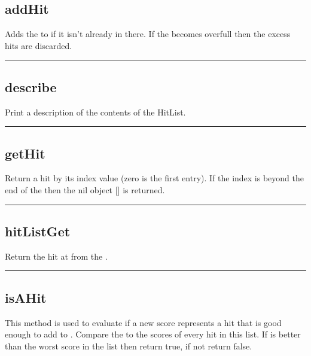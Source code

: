 \begin{itemize}
\subsection{addHit}
  \par
  Adds the  to  if it isn't already in there. If the  becomes overfull then the excess hits are discarded.

\rule{6in}{0.01cm}\par
{}\par
\subsection{describe}
  \par
  Print a description of the contents of the HitList.

\rule{6in}{0.01cm}\par
{}\par
\subsection{getHit}
  \par
  Return a hit by its index value  (zero is the first entry). If the index is beyond the end of the  then the nil object [] is returned.

\rule{6in}{0.01cm}\par
{}\par
\subsection{hitListGet}
  \par
  Return the hit at  from the .

\rule{6in}{0.01cm}\par
{}\par
\subsection{isAHit}
  \par
  This method is used to evaluate if a new score represents a hit that is good enough to add to .
  Compare the  to the scores of every hit in this list. If  is better than the worst score in the list then return true, if not return false. 


\end{itemize}
